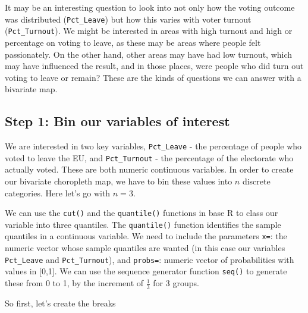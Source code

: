 \documentclass[
]{book}
\newenvironment{Shaded}{\begin{snugshade}}{\end{snugshade}}
\newcommand{\AttributeTok}[1]{\textcolor[rgb]{0.77,0.63,0.00}{#1}}
\newcommand{\ConstantTok}[1]{\textcolor[rgb]{0.00,0.00,0.00}{#1}}
\newcommand{\DecValTok}[1]{\textcolor[rgb]{0.00,0.00,0.81}{#1}}
\newcommand{\FunctionTok}[1]{\textcolor[rgb]{0.00,0.00,0.00}{#1}}
\newcommand{\NormalTok}[1]{#1}
\newcommand{\OtherTok}[1]{\textcolor[rgb]{0.56,0.35,0.01}{#1}}
\newcommand{\SpecialCharTok}[1]{\textcolor[rgb]{0.00,0.00,0.00}{#1}}
\begin{document}
It may be an interesting question to look into not only how the voting outcome was distributed (\texttt{Pct\_Leave}) but how this varies with voter turnout (\texttt{Pct\_Turnout}). We might be interested in areas with high turnout and high or percentage on voting to leave, as these may be areas where people felt passionately. On the other hand, other areas may have had low turnout, which may have influenced the result, and in those places, were people who did turn out voting to leave or remain? These are the kinds of questions we can answer with a bivariate map.

\hypertarget{step-1-bin-our-variables-of-interest}{%
\subsection{Step 1: Bin our variables of interest}\label{step-1-bin-our-variables-of-interest}}

We are interested in two key variables, \texttt{Pct\_Leave} - the percentage of people who voted to leave the EU, and \texttt{Pct\_Turnout} - the percentage of the electorate who actually voted. These are both numeric continuous variables. In order to create our bivariate choropleth map, we have to bin these values into \(n\) discrete categories. Here let's go with \(n = 3\).

We can use the \texttt{cut()} and the \texttt{quantile()} functions in base R to class our variable into three quantiles. The \texttt{quantile()} function identifies the sample quantiles in a continuous variable. We need to include the parameters \texttt{x=}: the numeric vector whose sample quantiles are wanted (in this case our variables \texttt{Pct\_Leave} and \texttt{Pct\_Turnout}), and \texttt{probs=}: numeric vector of probabilities with values in {[}0,1{]}. We can use the sequence generator function \texttt{seq()} to generate these from 0 to 1, by the increment of \(\frac{1}{3}\) for 3 groups.

So first, let's create the breaks

\begin{Shaded}
\end{Shaded}
\end{document}
